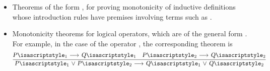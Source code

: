 \begin{isabellebody}
\begin{isamarkuptext}
\begin{itemize}
  \item Theorems of the form , for proving
  monotonicity of inductive definitions whose introduction rules have
  premises involving terms such as .

  \item Monotonicity theorems for logical operators, which are of the
  general form .  For example, in
  the case of the operator , the corresponding theorem is
  \[
  \infer{\isa{{\isaliteral{22}{\isachardoublequote}}P\isaliteral{5C3C5E7375623E}{}\isactrlsub {\isadigit{1}}\ {\isaliteral{5C3C6F723E}{\isasymor}}\ P\isaliteral{5C3C5E7375623E}{}\isactrlsub {\isadigit{2}}\ {\isaliteral{5C3C6C6F6E6772696768746172726F773E}{\isasymlongrightarrow}}\ Q\isaliteral{5C3C5E7375623E}{}\isactrlsub {\isadigit{1}}\ {\isaliteral{5C3C6F723E}{\isasymor}}\ Q\isaliteral{5C3C5E7375623E}{}\isactrlsub {\isadigit{2}}{\isaliteral{22}{\isachardoublequote}}}}{\isa{{\isaliteral{22}{\isachardoublequote}}P\isaliteral{5C3C5E7375623E}{}\isactrlsub {\isadigit{1}}\ {\isaliteral{5C3C6C6F6E6772696768746172726F773E}{\isasymlongrightarrow}}\ Q\isaliteral{5C3C5E7375623E}{}\isactrlsub {\isadigit{1}}{\isaliteral{22}{\isachardoublequote}}} & \isa{{\isaliteral{22}{\isachardoublequote}}P\isaliteral{5C3C5E7375623E}{}\isactrlsub {\isadigit{2}}\ {\isaliteral{5C3C6C6F6E6772696768746172726F773E}{\isasymlongrightarrow}}\ Q\isaliteral{5C3C5E7375623E}{}\isactrlsub {\isadigit{2}}{\isaliteral{22}{\isachardoublequote}}}}
  \]


\end{itemize}
\end{isamarkuptext}
\end{isabellebody}
